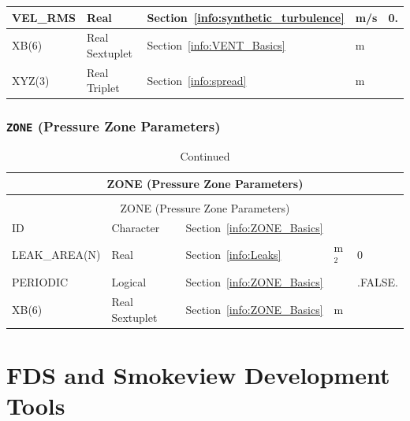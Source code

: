 \documentclass[11pt]{book}
\begin{document}
\begin{longtable}{@{\extracolsep{\fill}}|l|l|l|l|l|}
{\ct VEL\_RMS}              & Real              & Section~\ref{info:synthetic_turbulence}                   & m/s           & 0.                  \\ \hline
{\ct XB(6) }                & Real Sextuplet    & Section~\ref{info:VENT_Basics}                            & m             &                     \\ \hline
{\ct XYZ(3) }               & Real Triplet      & Section~\ref{info:spread}                                 & m             &                     \\ \hline
\end{longtable}


\section{\texorpdfstring{{\tt ZONE}}{ZONE} (Pressure Zone Parameters)}

\begin{longtable}{@{\extracolsep{\fill}}|l|l|l|l|l|}
\caption[Pressure zone parameters ({\ct ZONE} namelist group)]{For more information see Section~\ref{info:ZONE}.}
\label{tbl:ZONE} \\
\hline
\multicolumn{5}{|c|}{{\ct ZONE} (Pressure Zone Parameters)} \\
\hline \hline
\endfirsthead
\caption[]{Continued} \\
\hline
\multicolumn{5}{|c|}{{\ct ZONE} (Pressure Zone Parameters)} \\
\hline \hline
\endhead
{\ct ID}                    & Character         & Section~\ref{info:ZONE_Basics}     &        &               \\ \hline
{\ct LEAK\_AREA(N)}         & Real              & Section~\ref{info:Leaks}           & m$^2$  & 0             \\ \hline
{\ct PERIODIC}              & Logical           & Section~\ref{info:ZONE_Basics}     &        & {\ct .FALSE.} \\ \hline
{\ct XB(6)}                 & Real Sextuplet    & Section~\ref{info:ZONE_Basics}     & m      &               \\ \hline
\end{longtable}







\part{FDS and Smokeview Development Tools}
\end{document}
